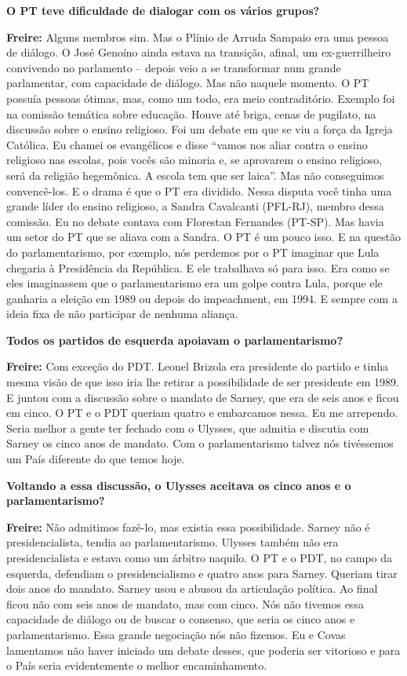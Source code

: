 \textbf{O PT teve dificuldade de dialogar com os vários grupos?}

\textbf{Freire:} Alguns membros sim. Mas o Plínio de Arruda Sampaio era
uma pessoa de diálogo. O José Genoíno ainda estava na transição, afinal,
um ex-guerrilheiro convivendo no parlamento -- depois veio a se
transformar num grande parlamentar, com capacidade de diálogo. Mas não
naquele momento. O PT possuía pessoas ótimas, mas, como um todo, era
meio contraditório. Exemplo foi na comissão temática sobre educação.
Houve até briga, cenas de pugilato, na discussão sobre o ensino
religioso. Foi um debate em que se viu a força da Igreja Católica. Eu
chamei os evangélicos e disse ``vamos nos aliar contra o ensino
religioso nas escolas, pois vocês são minoria e, se aprovarem o ensino
religioso, será da religião hegemônica. A escola tem que ser laica''.
Mas não conseguimos convencê-los. E o drama é que o PT era dividido.
Nessa disputa você tinha uma grande líder do ensino religioso, a Sandra
Cavalcanti (PFL-RJ), membro dessa comissão. Eu no debate contava com
Florestan Fernandes (PT-SP). Mas havia um setor do PT que se aliava com
a Sandra. O PT é um pouco isso. E na questão do parlamentarismo, por
exemplo, nós perdemos por o PT imaginar que Lula chegaria à Presidência
da República. E ele trabalhava só para isso. Era como se eles
imaginassem que o parlamentarismo era um golpe contra Lula, porque ele
ganharia a eleição em 1989 ou depois do impeachment, em 1994. E sempre
com a ideia fixa de não participar de nenhuma aliança.

\textbf{Todos os partidos de esquerda apoiavam o parlamentarismo?}

\textbf{Freire:} Com exceção do PDT. Leonel Brizola era presidente do
partido e tinha mesma visão de que isso iria lhe retirar a possibilidade
de ser presidente em 1989. E juntou com a discussão sobre o mandato de
Sarney, que era de seis anos e ficou em cinco. O PT e o PDT queriam
quatro e embarcamos nessa. Eu me arrependo. Seria melhor a gente ter
fechado com o Ulysses, que admitia e discutia com Sarney os cinco anos
de mandato. Com o parlamentarismo talvez nós tivéssemos um País
diferente do que temos hoje.

\textbf{Voltando a essa discussão, o Ulysses aceitava os cinco anos e o
parlamentarismo?}

\textbf{Freire:} Não admitimos fazê-lo, mas existia essa possibilidade.
Sarney não é presidencialista, tendia ao parlamentarismo. Ulysses também
não era presidencialista e estava como um árbitro naquilo. O PT e o PDT,
no campo da esquerda, defendiam o presidencialismo e quatro anos para
Sarney. Queriam tirar dois anos do mandato. Sarney usou e abusou da
articulação política. Ao final ficou não com seis anos de mandato, mas
com cinco. Nós não tivemos essa capacidade de diálogo ou de buscar o
consenso, que seria os cinco anos e parlamentarismo. Essa grande
negociação nós não fizemos. Eu e Covas lamentamos não haver iniciado um
debate desses, que poderia ser vitorioso e para o País seria
evidentemente o melhor encaminhamento.

